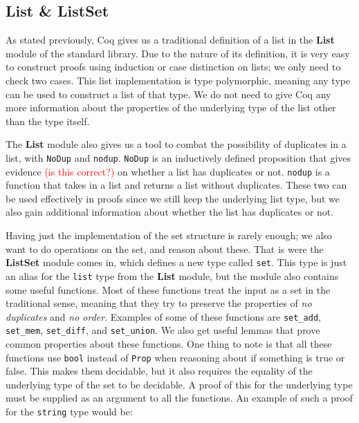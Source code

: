 
\subsection{List \& ListSet}

As stated previously, Coq gives us a traditional definition of a list in the \textbf{List} module of the standard library.
Due to the nature of its definition, it is very easy to construct proofs using induction or case distinction on lists;
we only need to check two cases.
This list implementation is type polymorphic, meaning any type can be used to construct a list of that type.
We do not need to give Coq any more information about the properties of the underlying type of the list other than the type itself.

The \textbf{List} module also gives us a tool to combat the possibility of duplicates in a list,
with \lstinline{NoDup} and \lstinline{nodup}.
\lstinline{NoDup} is an inductively defined proposition that gives evidence \textcolor{red}{(is this correct?)}
on whether a list has duplicates or not.
\lstinline{nodup} is a function that takes in a list and returns a list without duplicates.
These two can be used effectively in proofs since we still keep the underlying list type,
but we also gain additional information about whether the list has duplicates or not.

Having just the implementation of the set structure is rarely enough; we also want to do operations on the set, and reason about these.
That is were the \textbf{ListSet} module comes in, which defines a new type called \lstinline{set}.
This type is just an alias for the \lstinline{list} type from the \textbf{List} module,
but the module also contains some useful functions.
Most of these functions treat the input as a set in the traditional sense,
meaning that they try to preserve the properties of \textit{no duplicates} and \textit{no order}.
Examples of some of these functions are \lstinline{set_add}, \lstinline{set_mem},
\lstinline{set_diff}, and \lstinline{set_union}.
We also get useful lemmas that prove common properties about these functions.
One thing to note is that all these functions use \lstinline{bool} instead of
\lstinline{Prop} when reasoning about if something is true or false.
This makes them decidable, but it also requires the equality of the underlying type of the set to be decidable.
A proof of this for the underlying type must be supplied as an argument to all the functions.
An example of such a proof for the \lstinline{string} type would be:

